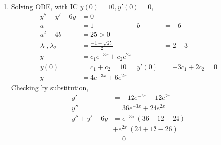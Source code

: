 \begin{enumerate}
    \item Solving ODE, with IC $ y(0) = 10, y'(0) = 0 $,
          \begin{align}
              y'' + y' - 6y            & = 0                                                           \\
              a                        & = 1                          & b     & = -6                   \\
              a^{2} - 4b               & = 25 > 0                                                      \\
              \lambda_{1}, \lambda_{2} & = \frac{-1 \pm \sqrt{25}}{2} &       & = 2, -3                \\
              y                        & = c_{1}e^{-3x} + c_{2}e^{2x}                                  \\
              y(0)                     & = c_{1} + c_{2} = 10         & y'(0) & = -3c_{1} + 2c_{2} = 0 \\
              y                        & = 4e^{-3x} + 6e^{2x}
          \end{align}
          Checking by substitution,
          \begin{align}
              y'            & = -12e^{-3x} + 12e^{2x}  \\
              y''           & = 36e^{-3x} + 24e^{2x}   \\
              y'' + y' - 6y & = e^{-3x}\ (36 - 12 -24) \\
                            & + e^{2x}\ (24 + 12 - 26) \\
                            & = 0
          \end{align}


\end{enumerate}
